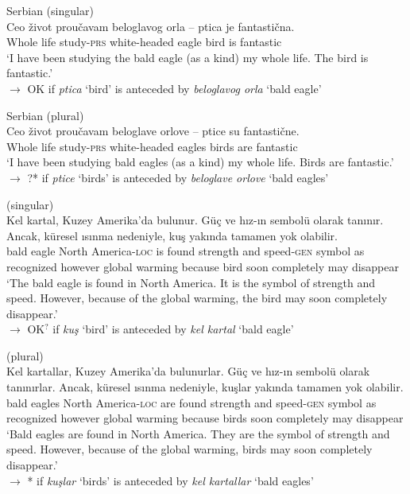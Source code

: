 \documentclass[output=paper,
modfonts
]{langscibook}
\begin{document}
	\ea \label{ex:despic:46}
	Serbian (singular) \\
	\gll 
	{Ceo} {\v zivot} {prou\v cavam} {beloglavog} {orla} {--} {ptica} {je} {fantasti\v cna}. \\
	Whole life study-\textsc{prs} white-headed eagle {} bird is fantastic \\
	\glt `I have been studying the bald eagle (as a kind) my whole life. The bird is fantastic.' \\
	$\rightarrow$ OK if \textit{ptica} `bird' is anteceded by \textit{beloglavog orla} `bald eagle'
	\z 
	
	\ea \label{ex:despic:47} 
	Serbian (plural) \\
	\gll 
	{Ceo} {\v zivot} {prou\v cavam} {beloglave} {orlove} {--} {ptice} {su} {fantasti\v cne.} \\
	Whole life study-\textsc{prs} white-headed eagles {} birds are fantastic \\
	\glt `I have been studying bald eagles (as a kind) my whole life. Birds are fantastic.' \\
	$\rightarrow$ ?* if \textit{ptice} `birds' is anteceded by \textit{beloglave orlove} `bald eagles'
	\z 
	
	\ea \label{ex:despic:48}
	 (singular) \\
	\gll 
	{Kel} {kartal}, {Kuzey} {Amerika'da} {bulunur}. {G\"u\c c} {ve} {h\i z-\i n} {sembol\"u} {olarak} {tan\i n\i r.} {Ancak}, {k\"uresel} {\i s\i nma} {nedeniyle}, {ku\c s} {yak\i nda} {tamamen} {yok} {olabilir}. \\
	bald eagle North America-\textsc{loc} {is found} strength and speed-\textsc{gen} symbol as recognized however global warming because bird soon completely may disappear \\
	\glt `The bald eagle is found in North America. It is the symbol of strength and speed. However, because of the global warming, the bird may soon completely disappear.' \\
	$\rightarrow$ OK$^?$ if \textit{ku\c s} `bird' is anteceded by \textit{kel kartal} `bald eagle'
	\z 
	
	
	\ea \label{ex:despic:49} 
	 (plural) \\
	\gll 
	{Kel} {kartallar}, {Kuzey} {Amerika'da} {bulunurlar}. {G\"u\c c} {ve} {h\i z-\i n} {sembol\"u} {olarak} {tan\i n\i rlar}. {Ancak}, {k\"uresel} {\i s\i nma} {nedeniyle}, {ku\c slar} {yak\i nda} {tamamen} {yok} {olabilir}. \\
	bald eagles North America-\textsc{loc} {are found} strength and speed-\textsc{gen} symbol as recognized however global warming because birds soon completely may disappear \\
	\glt `Bald eagles are found in North America. They are the symbol of strength and speed. However, because of the global warming, birds may soon completely disappear.' \\
	$\rightarrow$ * if \textit{ku\c slar} `birds' is anteceded by \textit{kel kartallar} `bald eagles' 
	\z 
	
\end{document}
